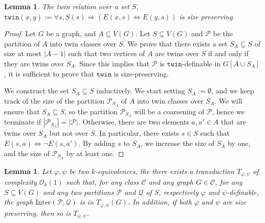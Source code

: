 \documentclass[11pt]{article}
\newtheorem{lemma}[theorem]{Lemma}
\theoremstyle{definition}
\newcommand{\CC}{{\mathscr C}}
\newcommand{\Oh}{\mathcal{O}}
\let\phi\varphi
\newcommand{\Pp}{\mathcal{P}}
\newcommand{\Qq}{\mathcal{Q}}
\newcommand{\twin}{\mathtt{twin}}
\begin{document}
\begin{lemma}\label{lem:twin_SP}
The twin relation over a set $S$, $\twin(x, y) := \forall s, S(s) \Rightarrow \left(E(x, s) \Leftrightarrow E(y, s) \right)$ is size preserving.
\end{lemma}
\begin{proof}
Let $G$ be a graph, and $A \subseteq V(G)$.
Let $S \subseteq V(G)$ and $\Pp$ be the partition of $A$ into twin classes over $S$.
We prove that there exists a set $S_A \subseteq S$ of size at most $|A - 1|$ such that two vertices of $A$ are twins over $S$ if and only if they are twins over $S_A$. Since this implies that $\Pp$ is $\twin$-definable in $G[A \cup S_A]$, it is sufficient to prove that $\twin$ is size-preserving.

We construct the set $S_A \subseteq S$ inductively.
We start setting $S_A := \emptyset$, and we keep track of the size of the partition $\Pp_{S_A}$ of $A$ into twin classes over $S_A$.
We will ensure that $S_A \subseteq S$, so the partition $\Pp_{S_A}$ will be a coarsening of $\Pp$, hence we terminate if $|\Pp_{S_A}| = |\Pp|$.
Otherwise, there are two elements $a, a' \in A$ that are twins over $S_A$ but not over $S$. In particular, there exists $s \in S$ such that $E(s, a) \Leftrightarrow \neg E(s, a')$.
By adding $s$ to $S_A$, we increase the size of $S_A$ by one, and the size of $\Pp_{S_A}$ by at least one.

\end{proof}
\begin{lemma}\label{lem:transInter}
    Let $\phi, \psi$ be two $k$-equivalences, the there exists a transduction $T_{\phi, \psi}$ of complexity $\Oh_k(1)$ such that,
    for any class $\CC$ and any graph $G \in \CC$, for any $S \subseteq V(G)$ and any two partitions $\mathcal P$ and $\mathcal Q$ of $S$, respectively $\phi$ and $\psi$-definable, the graph $\text{Inter}(\Pp , \Qq)$ is in $T_{\phi, \psi}(G)$.
    In addition, if both $\phi$ and $\psi$ are size preserving, then so is $T_{\phi, \psi}$.
\end{lemma}
\end{document}
